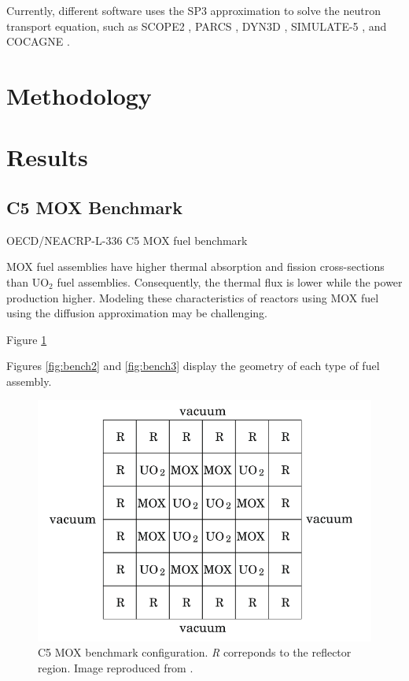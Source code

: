 \documentclass{anstrans}
\begin{document}



Currently, different software uses the SP3 approximation to solve the neutron transport equation, such as SCOPE2 \cite{tatsumi_object-oriented_2002}, PARCS \cite{downar_parcs_2004}, DYN3D \cite{beckert_development_2007}, SIMULATE-5 \cite{bahadir_studsviks_2009}, and COCAGNE \cite{fliscounakis_potential_2012}.




\section{Methodology}



\section{Results}

\subsection{C5 MOX Benchmark}

OECD/NEACRP-L-336 C5 MOX fuel benchmark \cite{cavarec_benchmark_1994}

MOX fuel assemblies have higher thermal absorption and fission cross-sections than UO$_2$ fuel assemblies.
Consequently, the thermal flux is lower while the power production higher.
Modeling these characteristics of reactors using MOX fuel using the diffusion approximation may be challenging.


Figure \ref{fig:bench1}

Figures \ref{fig:bench2} and \ref{fig:bench3} display the geometry of each type of fuel assembly.

\begin{figure}[htbp!] %
    \centering
    \includegraphics[width=0.95\linewidth]{figures/bench-config.png}
    \hfill
    \caption{C5 MOX benchmark configuration. \textit{R} correponds to the reflector region. Image reproduced from \cite{capilla_applications_2009}.}
    \label{fig:bench1}
\end{figure}
\end{document}
